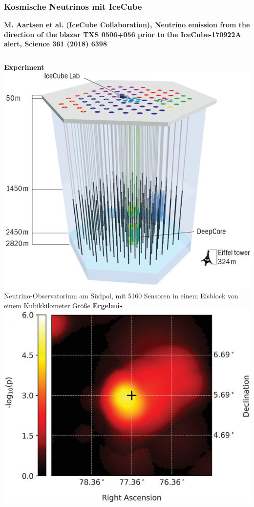 \documentclass[10pt,t]{beamer}
\begin{document}
\begin{frame}
\frametitle{Kosmische Neutrinos mit IceCube}
\vspace*{-2.6\baselineskip}
\alert{\bfseries\footnotesize M. Aartsen et al. (IceCube Collaboration), Neutrino emission from the direction of the blazar TXS 0506+056 prior to the IceCube-170922A alert, Science 361 (2018) 6398}
\vspace*{\baselineskip}
\begin{columns}
\textbf{Experiment} \\[1ex]
    \includegraphics[width=\textwidth]{icecube-experiment} \\
    Neutrino-Observatorium am Südpol, mit 5160 Sensoren in einem Eisblock von einem Kubikkilometer Größe
\textbf{Ergebnis} \\[1ex]
    \includegraphics[width=\textwidth]{icecube-ergebnis} \\

\end{columns}
\end{frame}
\end{document}
